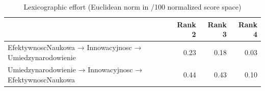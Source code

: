 \begin{table}[htbp]
\centering
\caption{Lexicographic effort (Euclidean norm in /100 normalized score space)}
\label{tab:e1-lexicographic}
\begin{tabular}{lrrr}
\toprule
 & Rank 2 & Rank 3 & Rank 4 \\
\midrule
EfektywnoscNaukowa → Innowacyjnosc → Umiedzynarodowienie & 0.23 & 0.18 & 0.03 \\
Umiedzynarodowienie → Innowacyjnosc → EfektywnoscNaukowa & 0.44 & 0.43 & 0.10 \\
\bottomrule
\end{tabular}
\end{table}
